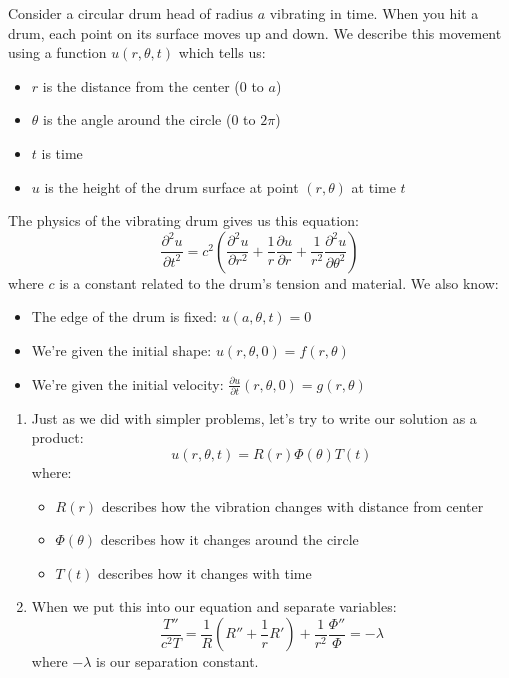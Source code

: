 \exampleline
\begin{example} 
Consider a circular drum head of radius $a$ vibrating in time. When you hit a drum, each point on its surface moves up and down. We describe this movement using a function $u(r,\theta,t)$ which tells us:
\begin{itemize}
    \item $r$ is the distance from the center (0 to $a$)
    \item $\theta$ is the angle around the circle (0 to $2\pi$)
    \item $t$ is time
    \item $u$ is the height of the drum surface at point $(r,\theta)$ at time $t$
\end{itemize}

\noindent The physics of the vibrating drum gives us this equation:
\[
\frac{\partial^2 u}{\partial t^2} = c^2\left(\frac{\partial^2 u}{\partial r^2} + \frac{1}{r}\frac{\partial u}{\partial r} + \frac{1}{r^2}\frac{\partial^2 u}{\partial \theta^2}\right)
\]
where $c$ is a constant related to the drum's tension and material. We also know:
\begin{itemize}
    \item The edge of the drum is fixed: $u(a,\theta,t) = 0$
    \item We're given the initial shape: $u(r,\theta,0) = f(r,\theta)$
    \item We're given the initial velocity: $\frac{\partial u}{\partial t}(r,\theta,0) = g(r,\theta)$
\end{itemize}

\begin{solution}
\begin{enumerate}
\item Just as we did with simpler problems, let's try to write our solution as a product:
   \[
   u(r,\theta,t) = R(r)\Phi(\theta)T(t)
   \]
   where:
   \begin{itemize}
       \item $R(r)$ describes how the vibration changes with distance from center
       \item $\Phi(\theta)$ describes how it changes around the circle
       \item $T(t)$ describes how it changes with time
   \end{itemize}

\item When we put this into our equation and separate variables:
   \[
   \frac{T''}{c^2T} = \frac{1}{R}\left(R'' + \frac{1}{r}R'\right) + \frac{1}{r^2}\frac{\Phi''}{\Phi} = -\lambda
   \]
   where $-\lambda$ is our separation constant.


\end{enumerate}
\end{solution}
\end{example}
